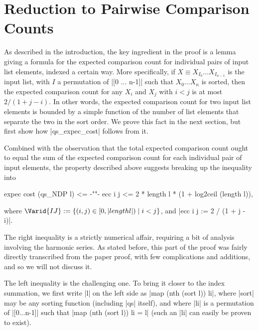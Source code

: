 \documentclass[runningheads]{llncs}
\begin{document}
\section{Reduction to Pairwise Comparison Counts}
\label{reduction}

As described in the introduction, the key ingredient in the proof is a lemma giving a formula for the expected comparison count for individual pairs of input list elements, indexed a certain way. More specifically, if $X \equiv X_{I_0} \ldots X_{I_{n-1}}$ is the input list, with $I$ a permutation of |[0 ... n-1]| such that $X_0 \ldots X_n$ is sorted, then the expected comparison count for any $X_i$ and $X_j$ with $i < j$ is at most $2 / (1 + j - i)$. In other words, the expected comparison count for two input list elements is bounded by a simple function of the number of list elements that separate the two in the sort order. We prove this fact in the next section, but first show how |qs_expec_cost| follows from it.

Combined with the observation that the total expected comparison count ought to equal the sum of the expected comparison count for each individual pair of input elements, the property described above suggests breaking up the inequality into
\begin{code}
  expec cost (qs_NDP l) <= {-""-} ecc i j <= 2 * length l * (1 + log2ceil (length l)),
\end{code}
where $\Varid{IJ} := \{ (i, j) \in [0, |length l|) \mid i < j \}$, and |ecc i j := 2 / (1 + j - i)|.

The right inequality is a strictly numerical affair, requiring a bit of analysis involving the harmonic series. As stated before, this part of the proof 
    was 
fairly directly transcribed from the paper proof, with few complications and additions, and so we will not discuss it.

The left inequality is the challenging one. To bring it closer to the index summation, we first write |l| on the left side as |map (nth (sort l)) li|, where |sort| may be any sorting function (including |qs| itself), and where |li| is a permutation of |[0...n-1]| such that |map (nth (sort l)) li = l| (such an |li| can easily be proven to exist).
\end{document}
